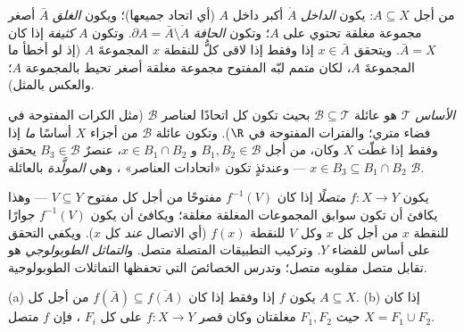 \begin{definition}\label{def:b3:topology:interior}
من أجل $A \subseteq X$: يكون \emph{الداخل} $\mathring A$ أكبر
 داخل $A$ (أي اتحاد جميعها)؛ ويكون
\emph{الغلق} $\bar A$ أصغر مجموعة مغلقة تحتوي على
$A$؛ وتكون \emph{الحافة} $\partial A = \bar A
\setminus \mathring A$. وتكون $A$
\emph{كثيفة} إذا كان $\bar A = X$. ويتحقق
$x \in \bar A$ إذا وفقط إذا لاقى كلُّ  للنقطة $x$ المجموعةَ
$A$ (إذ لو أخطأ  ما المجموعةَ $A$، لكان متمم لبّه المفتوح
مجموعة مغلقة أصغر تحيط بالمجموعة $A$؛ والعكس بالمثل).
\end{definition}

\begin{definition}\label{def:b3:topology:basis}
\emph{الأساس}  $\mathcal T$ هو
عائلة $\mathcal B \subseteq \mathcal T$ بحيث تكون كل  اتحادًا لعناصر
$\mathcal B$ (مثل الكرات المفتوحة في فضاء متري؛ والفترات
المفتوحة في $\R$). وتكون عائلة $\mathcal B$ من أجزاء $X$ أساسًا
 \emph{ما} إذا وفقط إذا غطّت $X$ وكان، من أجل $B_1, B_2 \in \mathcal B$
و $x \in B_1 \cap B_2$، عنصرٌ $B_3 \in \mathcal B$ يحقق $x \in B_3 \subseteq B_1\cap B_2$ --- وعندئذٍ تكون «اتحادات
العناصر» ، وهي  \emph{المولَّدة}
بالعائلة $\mathcal B$.
\end{definition}

\begin{definition}\label{def:b3:topology:continuity}
يكون $f \colon X \to Y$ \emph{متصلًا} إذا كان $f^{-1}(V)$
مفتوحًا من أجل كل مفتوح $V \subseteq Y$ --- وهذا يكافئ أن تكون
سوابق المجموعات المغلقة مغلقة؛ ويكافئ أن يكون $f^{-1}(V)$
جوارًا للنقطة $x$ من أجل كل $x$ وكل  $V$ للنقطة $f(x)$ (أي
الاتصال \emph{عند} كل $x$). ويكفي التحقق على أساس للفضاء $Y$.
وتركيب التطبيقات المتصلة متصل. و\emph{التماثل
الطوبولوجي} هو تقابل متصل مقلوبه متصل؛
وتدرس  الخصائصَ التي تحفظها التماثلات الطوبولوجية.
\end{definition}

\begin{proposition}
\label{prop:b3:topology:gluing}
(a) يكون $f$  إذا وفقط إذا كان $f(\bar A) \subseteq \overline{f(A)}$ من أجل كل
$A \subseteq X$.
(b) إذا كان $X = F_1 \cup F_2$ حيث $F_1, F_2$ مغلقتان وكان قصر $f\colon X
\to Y$ على
كل $F_i$ ، فإن $f$ متصل.
\end{proposition}

